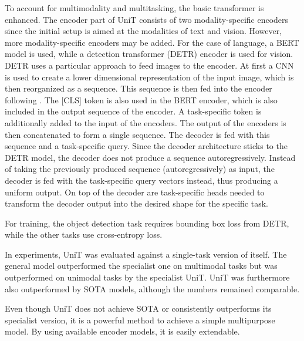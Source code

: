 \documentclass[
]{krantz}
\begin{document}
To account for multimodality and multitasking, the basic transformer \citep{vaswani2017attention} is enhanced. The encoder part of UniT consists of two modality-specific encoders since the initial
setup is aimed at the modalities of text and vision. However, more modality-specific encoders may be added. For the case of language, a BERT model \citep{Devlin2018} is used, while a
detection transformer (DETR) \citep{Carion2020} encoder is used for vision. DETR uses a particular approach to feed images to the encoder. At first a CNN is used to create a lower dimensional
representation of the input image, which is then reorganized as a sequence. This sequence is then fed into the encoder following \citet{vaswani2017attention}. The {[}CLS{]} token is also used in the BERT
encoder, which is also included in the output sequence of the encoder. A task-specific token is additionally added to the input of the encoders. The output of the encoders is then concatenated
to form a single sequence. The decoder is fed with this sequence and a task-specific query. Since the decoder architecture sticks to the DETR model, the decoder does not produce a sequence
autoregressively. Instead of taking the previously produced sequence (autoregressively) as input, the decoder is fed with the task-specific query vectors instead, thus producing a uniform output. On top of the
decoder are task-specific heads needed to transform the decoder output into the desired shape for the specific task.

For training, the object detection task requires bounding box loss from DETR, while the other tasks use cross-entropy loss.

In experiments, UniT was evaluated against a single-task version of itself. The
general model outperformed the specialist one on multimodal tasks but was outperformed on unimodal tasks by the specialist UniT. UniT was furthermore also outperformed by SOTA models, although
the numbers remained comparable.

Even though UniT does not achieve SOTA or consistently outperforms its specialist version, it is a powerful method to achieve a simple multipurpose model. By using available encoder models, it
is easily extendable.
\end{document}
